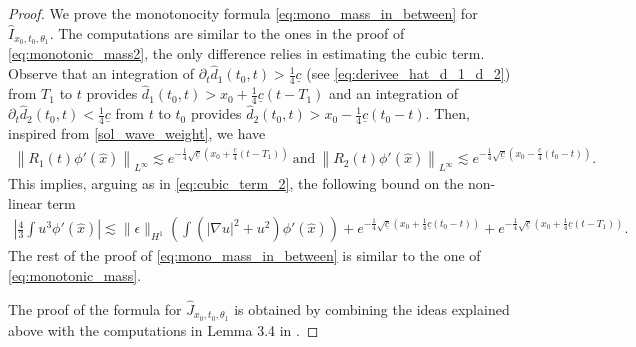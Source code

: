 \documentclass[reqno,10pt]{amsart}
\numberwithin{equation}{section}
\begin{document}
\begin{proof}
We prove the monotonocity formula \eqref{eq:mono_mass_in_between} for $\hat{I}_{x_0,t_0,\theta_1}$. The computations are similar to the ones in the proof of \eqref{eq:monotonic_mass2}, the only difference relies in estimating the cubic term. Observe that an integration of $\partial_t \hat{d}_1(t_0,t) > \frac14 \underline{c}$ (see \eqref{eq:derivee_hat_d_1_d_2}) from $T_1$ to $t$ provides $\hat{d}_1(t_0,t) > x_0 + \frac14 \underline{c} (t-T_1)$ and an integration of $\partial_t \hat{d}_2(t_0,t) < \frac14 \underline{c}$ from $t$ to $t_0$ provides $\hat{d}_2(t_0,t)> x_0 - \frac14 \underline{c} (t_0-t)$. Then, inspired from \eqref{sol_wave_weight}, we have
\begin{align*}
		\left\| R_1(t) \phi'(\hat{x}) \right\|_{L^\infty} \lesssim e^{-\frac14 \sqrt{\underline{c}} \left(x_0 +\frac{\underline{c}}{4} (t-T_1)\right)} \ \text{and} \ \left\| R_2(t) \phi'(\hat{x}) \right\|_{L^\infty} \lesssim e^{-\frac14 \sqrt{\underline{c}} \left(x_0 -\frac{\underline{c}}{4} (t_0-t)\right)}.
\end{align*}
This implies, arguing as in \eqref{eq:cubic_term_2}, the following bound on the non-linear term
\begin{align*}
		\left\vert \frac43 \int u^3 \phi'(\hat{x}) \right\vert \lesssim \| \epsilon \|_{H^1} \left( \int \left( \vert \nabla u \vert^2 + u^2 \right) \phi'(\hat{x}) \right) + e^{-\frac14 \sqrt{\underline{c}} \left( x_0 + \frac14 \underline{c} (t_0-t)\right)} + e^{-\frac14\sqrt{\underline{c}} \left( x_0 + \frac14 \underline{c} (t-T_1)\right)} .
	\end{align*}
The rest of the proof of \eqref{eq:mono_mass_in_between} is similar to the one of \eqref{eq:monotonic_mass}.

The proof of the formula for $\hat{J}_{x_0,t_0,\theta_1}$ is obtained by combining the ideas explained above with the computations in Lemma 3.4 in \cite{CMPS16}.
\end{proof}
\end{document}
